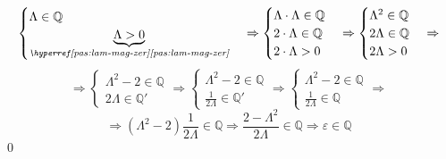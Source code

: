 \begin{enumerate}
\begin{demonstration}
\begin{enumerate}[label=(\roman*)]
\begin{enumerate}[label=\arabic*.]
\begin{enumerate}[label=\arabic{enumiii}.\arabic*.]
                    \[ 
                        \begin{cases}
                            \Lambda \in \mathbb{Q} \\
                            \underbrace{\Lambda > 0}_{\pasref{pas:lam-mag-zer}} \\
                        \end{cases}\Rightarrow
                        \begin{cases}
                            \Lambda\cdot\Lambda \in \mathbb{Q} \\
                            2\cdot\Lambda \in \mathbb{Q} \\
                            2\cdot\Lambda  > 0 \\
                        \end{cases}\Rightarrow
                        \begin{cases}
                            \Lambda^2 \in \mathbb{Q} \\
                            2\Lambda \in \mathbb{Q} \\
                            2\Lambda  > 0 \\
                        \end{cases}\Rightarrow\]\[\Rightarrow
                        \begin{cases}
                            \Lambda^2 - 2 \in \mathbb{Q} \\
                            2\Lambda \in \mathbb{Q}'
                        \end{cases}\Rightarrow
                        \begin{cases}
                            \Lambda^2 - 2 \in \mathbb{Q} \\
                            \frac{1}{2\Lambda} \in \mathbb{Q}'
                        \end{cases}\Rightarrow
                        \begin{cases}
                            \Lambda^2 - 2 \in \mathbb{Q} \\
                            \frac{1}{2\Lambda} \in \mathbb{Q}
                        \end{cases}\Rightarrow\]\[\Rightarrow
                        \left(\Lambda^2 - 2 \right) \frac{1}{2\Lambda} \in \mathbb{Q} \Rightarrow
                        \frac{2 - \Lambda^2}{2\Lambda} \in \mathbb{Q} \Rightarrow
                        \varepsilon\in\mathbb{Q}
                    \]
                    \qed


\end{enumerate}
\end{enumerate}
\end{enumerate}
\end{demonstration}
\end{enumerate}
